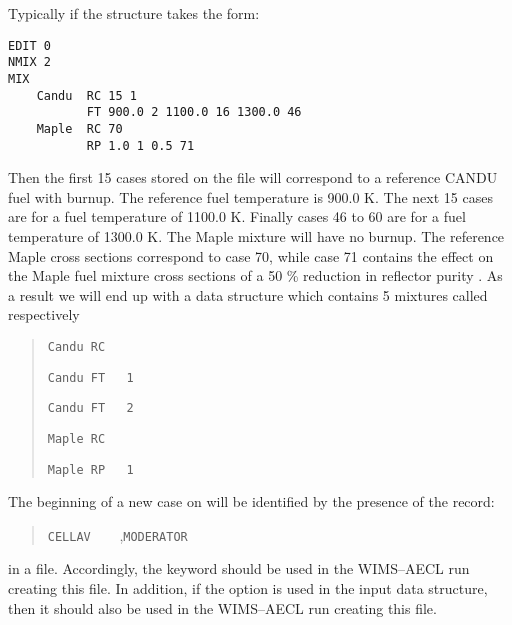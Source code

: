 Typically if the
 structure takes the form:
\begin{verbatim}
EDIT 0 
NMIX 2 
MIX
    Candu  RC 15 1
           FT 900.0 2 1100.0 16 1300.0 46
    Maple  RC 70 
           RP 1.0 1 0.5 71 
\end{verbatim}
Then the first 15 cases stored on the  file will correspond to a reference CANDU fuel with burnup. The
reference fuel temperature is 900.0 K. The next 15 cases are for a fuel
temperature of 1100.0 K. Finally cases 46 to 60 are for a fuel temperature of 1300.0 K.
The Maple mixture will have no burnup. The reference Maple cross sections correspond to case 70, while case 71
contains the effect on the Maple fuel mixture cross sections of a 50 \% reduction in reflector purity . As a result
we will end up with a
 data structure which contains 5 mixtures called respectively
\begin{quote}
\verb*|Candu RC    |

\verb*|Candu FT   1|

\verb*|Candu FT   2|

\verb*|Maple RC    |

\verb*|Maple RP   1|
\end{quote}

The beginning of a new case on  will be identified by the presence of
the record:
\begin{quote}
\verb*|CELLAV    |,\verb*|MODERATOR|
\end{quote}
in a  file. Accordingly, the keyword  should be used in the WIMS--AECL run creating this file.
In addition, if the  option is used in the  input data structure, then it should also be
used in the WIMS--AECL run creating this file.

\clearpage
